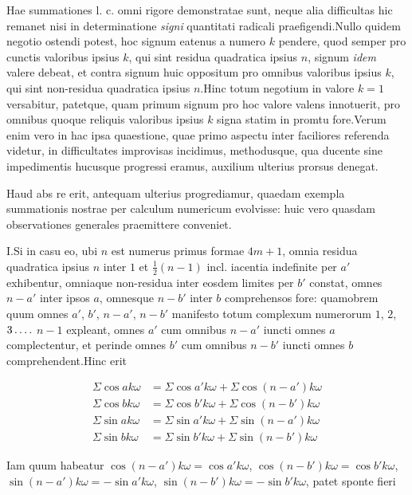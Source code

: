 Hae summationes l. c. omni rigore demonstratae sunt, neque alia difficultas hic remanet nisi in determinatione \emph{signi} quantitati radicali praefigendi.\quad Nullo quidem negotio ostendi potest, hoc signum eatenus a numero $k$ pendere, quod semper pro cunctis valoribus ipsius $k$, qui sint residua quadratica ipsius $n$, signum \emph{idem} valere debeat, et contra signum huic oppositum pro omnibus valoribus ipsius $k$, qui sint non-residua quadratica ipsius $n$.\quad Hinc totum negotium in valore $k=1$ versabitur, patetque, quam primum signum pro hoc valore valens innotuerit, pro omnibus quoque reliquis valoribus ipsius $k$ signa statim in promtu fore.\quad Verum enim vero in hac ipsa quaestione, quae primo aspectu inter faciliores referenda videtur, in difficultates improvisas incidimus, methodusque, qua ducente sine impedimentis hucusque progressi eramus, auxilium ulterius prorsus denegat.


Haud abs re erit, antequam ulterius progrediamur, quaedam exempla summationis nostrae per calculum numericum evolvisse: huic vero quasdam observationes generales praemittere conveniet.

I.\quad Si in casu eo, ubi $n$ est numerus primus formae $4m+1$, omnia residua quadratica ipsius $n$ inter $1$ et $\frac12(n-1)$ incl. iacentia indefinite per $a'$ exhibentur, omniaque non-residua inter eosdem limites per $b'$ constat, omnes $n-a'$ inter ipsos $a$, omnesque $n-b'$ inter $b$ comprehensos fore: quamobrem quum omnes $a'$, $b'$, $n-a'$, $n-b'$ manifesto totum complexum numerorum $1$, $2$, $3\mathinner{.\,.\,.\,.}$ $n-1$ expleant, omnes $a'$ cum omnibus $n-a'$ iuncti omnes $a$ complectentur, et perinde omnes $b'$ cum omnibus $n-b'$ iuncti omnes $b$ comprehendent.\quad Hinc erit

%
\[
\begin{aligned}
\Sigma\cos ak\omega&=\Sigma\cos a'k\omega+\Sigma\cos(n-a')k\omega\\
\Sigma\cos bk\omega&=\Sigma\cos b'k\omega+\Sigma\cos(n-b')k\omega\\
\Sigma\sin ak\omega&=\Sigma\sin a'k\omega+\Sigma\sin(n-a')k\omega\\
\Sigma\sin bk\omega&=\Sigma\sin b'k\omega+\Sigma\sin(n-b')k\omega
\end{aligned}
\]

Iam quum habeatur $\cos(n-a')k\omega=\cos a'k\omega$, $\cos(n-b')k\omega=\cos b'k\omega$, $\sin(n-a')k\omega=-\sin a'k\omega$, $\sin(n-b')k\omega=-\sin b'k\omega$, patet sponte fieri

